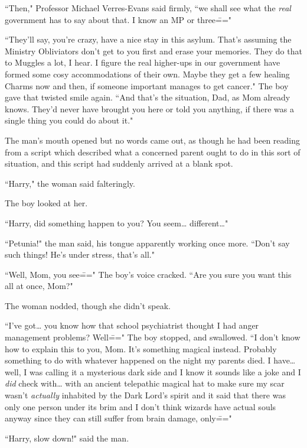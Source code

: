 ``Then," Professor Michael Verres-Evans said firmly, ``we shall see what the \emph{real} government has to say about that. I know an MP or three\==="

``They'll say, you're crazy, have a nice stay in this asylum. That's assuming the Ministry Obliviators don't get to you first and erase your memories. They do that to Muggles a lot, I hear. I figure the real higher-ups in our government have formed some cosy accommodations of their own. Maybe they get a few healing Charms now and then, if someone important manages to get cancer." The boy gave that twisted smile again. ``And that's the situation, Dad, as Mom already knows. They'd never have brought you here or told you anything, if there was a single thing you could do about it."

The man's mouth opened but no words came out, as though he had been reading from a script which described what a concerned parent ought to do in this sort of situation, and this script had suddenly arrived at a blank spot.

``Harry," the woman said falteringly.

The boy looked at her.

``Harry, did something happen to you? You seem{\ldots} different{\ldots}"

``Petunia!" the man said, his tongue apparently working once more. ``Don't say such things! He's under stress, that's all."

``Well, Mom, you see\===" The boy's voice cracked. ``Are you sure you want this all at once, Mom?"

The woman nodded, though she didn't speak.

``I've got{\ldots} you know how that school psychiatrist thought I had anger management problems? Well\===" The boy stopped, and swallowed. ``I don't know how to explain this to you, Mom. It's something magical instead. Probably something to do with whatever happened on the night my parents died. I have{\ldots} well, I was calling it a mysterious dark side and I know it sounds like a joke and I \emph{did} check with{\ldots} with an ancient telepathic magical hat to make sure my scar wasn't \emph{actually} inhabited by the Dark Lord's spirit and it said that there was only one person under its brim and I don't think wizards have actual souls anyway since they can still suffer from brain damage, only\==="

``Harry, slow down!" said the man.

